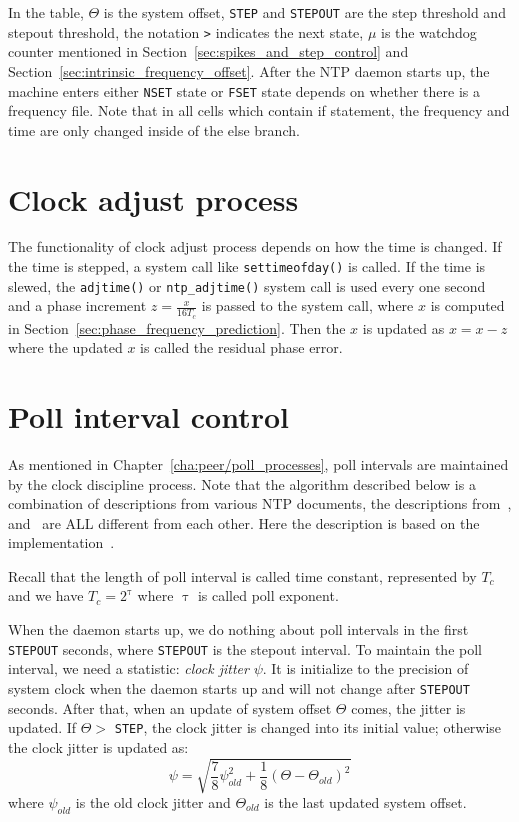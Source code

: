 In the table, $\Theta$ is the system offset, \verb|STEP| and \verb|STEPOUT| are
the step threshold and stepout threshold, the notation \verb|>| indicates the
next state, $\mu$ is the watchdog counter mentioned in
Section~\ref{sec:spikes_and_step_control} and
Section~\ref{sec:intrinsic_frequency_offset}. After the NTP daemon starts up,
the machine enters either \verb|NSET| state or \verb|FSET| state depends on
whether there is a frequency file. Note that in all cells which contain if
statement, the frequency and time are only changed inside of the else branch.

\section{Clock adjust process}%
\label{sec:clock_adjust_process}
The functionality of clock adjust process depends on how the time is changed.
If the time is stepped, a system call like \verb|settimeofday()| is called. If
the time is slewed, the \verb|adjtime()| or \verb|ntp_adjtime()| system call is
used every one second and a phase increment $z=\frac{x}{16T_c}$ is passed to
the system call, where $x$ is computed in
Section~\ref{sec:phase_frequency_prediction}. Then the $x$ is updated as
$x=x-z$ where the updated $x$ is called the residual phase error.

\section{Poll interval control}%
\label{sec:poll_interval_control}
As mentioned in Chapter~\ref{cha:peer/poll_processes}, poll intervals are
maintained by the clock discipline process. Note that the algorithm described
below is a combination of descriptions from various NTP documents, the
descriptions from~\cite{redbook}, \cite{poll_process} and~\cite{rfc5905} are
ALL different from each other. Here the description is based on the
implementation~\cite{source_code}.

Recall that the length of poll interval is called time constant, represented by
$T_c$ and we have $T_c = 2^\uptau$ where $\uptau$ is called poll exponent.

When the daemon starts up, we do nothing about poll intervals in the first
\verb|STEPOUT| seconds, where \verb|STEPOUT| is the stepout interval.
To maintain the poll interval, we need a statistic: \emph{clock jitter} $\psi$.
It is initialize to the precision of system clock when the daemon starts up and
will not change after \verb|STEPOUT| seconds. After that, when an update of
system offset $\Theta$ comes, the jitter is updated. If $\Theta > $
\verb|STEP|, the clock jitter is changed into its initial value; otherwise the
clock jitter is updated as:
\begin{equation}
    \psi = \sqrt{ \frac{7}{8}\psi_{old}^2 + \frac{1}{8}\left(\Theta -
    \Theta_{old}\right)^2 }
    \label{eq:clock_jitter}
\end{equation}
where $\psi_{old}$ is the old clock jitter and $\Theta_{old}$ is the last
updated system offset. 

